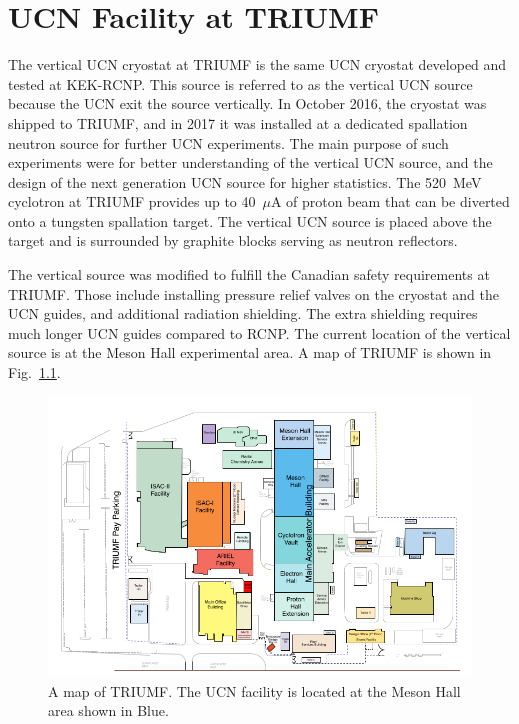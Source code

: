 \chapter{UCN Facility at TRIUMF\label{chap:UCNattriumf}}


The vertical UCN cryostat at TRIUMF is the same UCN cryostat developed
and tested at KEK-RCNP.  This source is referred to as the vertical
UCN source because the UCN exit the source vertically.  In October
2016, the cryostat was shipped to TRIUMF, and in 2017 it was installed
at a dedicated spallation neutron source for further UCN
experiments. The main purpose of such experiments were for better
understanding of the vertical UCN source, and the design of the next
generation UCN source for higher statistics. The 520~MeV cyclotron at
TRIUMF provides up to 40~$\mu$A of proton beam that can be diverted
onto a tungsten spallation target. The vertical UCN source is placed
above the target and is surrounded by graphite blocks serving as
neutron reflectors.


The vertical source was modified to fulfill the Canadian safety
requirements at TRIUMF. Those include installing pressure relief
valves on the cryostat and the UCN guides, and additional radiation
shielding. The extra shielding requires much longer UCN guides
compared to RCNP. The current location of the vertical source is at
the Meson Hall experimental area. A map of TRIUMF is shown in
Fig.~\ref{fig:sitemap}.

\begin{figure}[h!]
  \centering
  \includegraphics[width=1.0\textwidth]{sitemap.png}
  \caption{A map of TRIUMF. The UCN facility is located at the Meson
    Hall area shown in Blue.}
  \label{fig:sitemap}
\end{figure}

